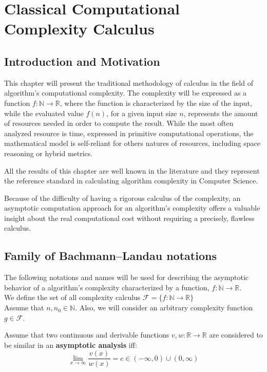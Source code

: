 \chapter{Classical Computational Complexity Calculus }


\section{Introduction and Motivation}
This chapter will present the traditional methodology of calculus in the field of algorithm's computational complexity. The complexity will be expressed as a function $f:\mathbb{N}\longrightarrow\mathbb{R}$, where the function is characterized by the size of the input, while the evaluated value $f(n)$, for a given input size $n$, represents the amount of resources needed in order to compute the result. While the most often analyzed resource is time, expressed in primitive computational operations, the mathematical model is self-reliant for others natures of resources, including space reasoning or hybrid metrics.

All the results of this chapter are well known in the literature and they represent the reference standard in calculating algorithm complexity in Computer Science.

Because of the difficulty of having a rigorous calculus of the complexity, an asymptotic computation approach for an algorithm's complexity offers a valuable insight about the real computational cost without requiring a precisely, flawless calculus.


\section{Family of Bachmann–Landau notations}
The following notations and names will be used for describing the asymptotic behavior of a algorithm's complexity characterized by a function, $f:\mathbb{N}\longrightarrow\mathbb{R}$. \\
We define the set of all complexity calculus $\mathcal{F}= \lbrace f:\mathbb{N}\longrightarrow\mathbb{R} \rbrace$
\\Assume that $n, n_{0}\in\mathbb{N}$. Also, we will consider an arbitrary complexity function $g \in \mathcal{F}$. \\

\begin{definition}
    Assume that two continuous and derivable functions $v,w:\mathbb{R}\longrightarrow\mathbb{R}$ are considered to be similar in an \textbf{asymptotic analysis} iff:
    \[\lim_{x\to\infty} \frac{v(x)}{w(x)} = c \in (-\infty, 0) \cup (0,\infty) \]
\end{definition}

